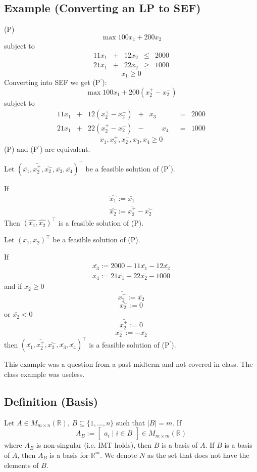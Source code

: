 \subsection{Example (Converting an LP to SEF)}
(P)
\[\max 100x_1+200x_2\]
subject to
\[
\begin{array}{ccccc}
    11x_1 & + & 12x_2 & \le & 2000\\
    21x_1 & + & 22x_2 & \ge & 1000
\end{array}
\]
\[x_1 \ge 0\]
Converting into SEF we get (P$^\prime$):
\[\max 100x_1+200(x_2^+-x_2^-)\]
subject to
\[
\begin{array}{ccccccccc}
    11x_1 & + & 12(x_2^+-x_2^-) & + & x_3 & & & = & 2000\\
    21x_1 & + & 22(x_2^+-x_2^-) & - & & x_4 & & = & 1000
\end{array}
\]
\[x_1,x_2^+,x_2^-,x_3,x_4\ge 0\]
(P) and (P$^\prime$) are equivalent.

Let
$(\bar{x_1}, \bar{x_2^+}, \bar{x_2^-}, \bar{x_3}, \bar{x_4})^\top$
be a feasible solution of (P$^\prime$).


If
\begin{align*}
    \hat{x_1}:=\bar{x_1}\\
    \hat{x_2}:=\bar{x_2^+}-\bar{x_2^-}
\end{align*}
Then 
$(\hat{x_1},\hat{x_2})^\top$
is a feasible solution of (P).

Let
$(\bar{x_1}, \bar{x_2})^\top$
be a feasible solution of (P).

If
\begin{align*}
    \bar{x_3}:=2000-11\bar{x_1}-12\bar{x_2}\\
    \bar{x_4}:=21\bar{x_1}+22\bar{x_2}-1000
\end{align*}
and 
if $\bar{x_2}\ge 0$
\[\bar{x_2^+}:=\bar{x_2}\]
\[\bar{x_2^-}:=0\]
or $\bar{x_2}< 0$
\[\bar{x_2^+}:=0\]
\[\bar{x_2^-}:=-\bar{x_2}\]
then $(\bar{x_1},\bar{x_2^+},\bar{x_2^-},\bar{x_3},\bar{x_4})^\top$
is a feasible solution of (P$^\prime$).
\begin{remark}
    This example was a question from a past midterm and not covered in class.
    The class example was useless.
\end{remark}

\begin{defbox}
    \subsection{Definition (Basis)}
    Let $A\in M_{m\times n}(\mathbb{R})$, $B\subseteq\{1,\dots,n\}$ such that $|B|=m$. If
    \[A_B:=
    \begin{bmatrix}
        a_i \mid i\in B
    \end{bmatrix}\in M_{m\times m}(\mathbb{R})
    \]
    where $A_B$ is non-singular (i.e. IMT holds), then $B$ is a basis of $A$.
    If $B$ is a basis of $A$, then $A_B$ is a basis for $\mathbb{R}^m$. We
    denote $N$ as the set that does not have the elements of $B$.
\end{defbox}

